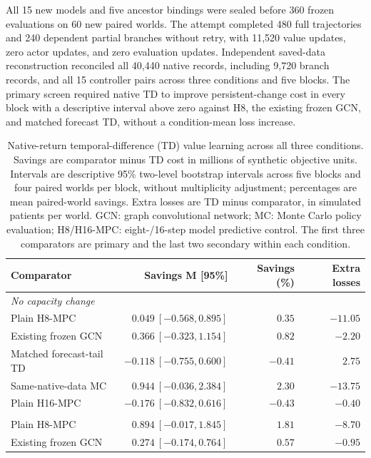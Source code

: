 \documentclass[preprint,review,12pt]{elsarticle}
\begin{document}
All 15 new models and five ancestor bindings were sealed before 360 frozen
evaluations on 60 new paired worlds. The attempt completed 480 full trajectories
and 240 dependent partial branches without retry, with 11,520 value updates,
zero actor updates, and zero evaluation updates. Independent saved-data
reconstruction reconciled all 40,440 native records, including 9,720 branch
records, and all 15 controller pairs across three conditions and five blocks.
The primary screen required native TD to improve persistent-change cost in
every block with a descriptive interval above zero against H8, the existing
frozen GCN, and matched forecast TD, without a condition-mean loss increase.

\begin{table}[tbp]
\centering
\caption{Native-return temporal-difference (TD) value learning across all three
conditions. Savings are comparator minus TD cost in millions of synthetic
objective units. Intervals are descriptive 95\% two-level bootstrap intervals
across five blocks and four paired worlds per block, without multiplicity
adjustment; percentages are mean paired-world savings. Extra losses are TD
minus comparator, in simulated patients per world. GCN: graph convolutional
network; MC: Monte Carlo policy evaluation; H8/H16-MPC: eight-/16-step model
predictive control. The first three comparators are primary and the last two
secondary within each condition.}
\label{tab:native-tail-comparison}
\small
\setlength{\tabcolsep}{4pt}
\begin{tabularx}{\textwidth}{Xrrr}
\toprule
Comparator & Savings M [95\%] & Savings (\%) & Extra losses \\
\midrule
\multicolumn{4}{l}{\emph{No capacity change}} \\
Plain H8-MPC & $0.049\ [-0.568,0.895]$ & $0.35$ & $-11.05$ \\
Existing frozen GCN & $0.366\ [-0.323,1.154]$ & $0.82$ & $-2.20$ \\
Matched forecast-tail TD & $-0.118\ [-0.755,0.600]$ & $-0.41$ & $2.75$ \\
Same-native-data MC & $0.944\ [-0.036,2.384]$ & $2.30$ & $-13.75$ \\
Plain H16-MPC & $-0.176\ [-0.832,0.616]$ & $-0.43$ & $-0.40$ \\
\addlinespace
\multicolumn{4}{l}{\emph{Persistent capacity change}} \\
Plain H8-MPC & $0.894\ [-0.017,1.845]$ & $1.81$ & $-8.70$ \\
Existing frozen GCN & $0.274\ [-0.174,0.764]$ & $0.57$ & $-0.95$ \\

\end{tabularx}
\end{table}
\end{document}
